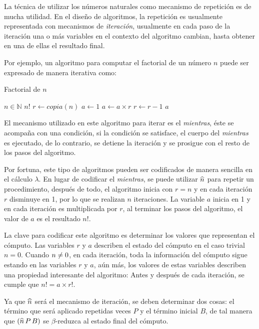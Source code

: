 La técnica de utilizar los números naturales como mecanismo de repetición es de mucha utilidad. En el diseño de algoritmos, la repetición es usualmente representada con mecanismos de \emph{iteración}, usualmente en cada paso de la iteración una o más variables en el contexto del algoritmo cambian, hasta obtener en una de ellas el resultado final.

Por ejemplo, un algoritmo para computar el factorial de un número $ n $ puede ser expresado de manera iterativa como:

\begin{algorithm}
  \caption{Factorial de $ n $}
  \label{alg:factorial}
  \begin{algorithmic}
    \REQUIRE $ n \in \mathbb{N} $
    \ENSURE $ n! $
    \STATE $ r \leftarrow copia(n) $
    \STATE $ a \leftarrow 1 $
    \STATE $ a \leftarrow a \times r $
    \STATE $ r \leftarrow r - 1 $
    \ENDWHILE
    \RETURN $ a $
  \end{algorithmic}
\end{algorithm}

El mecanismo utilizado en este algoritmo para iterar es el \emph{mientras}, éste se acompaña con una condición, si la condición se satisface, el cuerpo del \emph{mientras} es ejecutado, de lo contrario, se detiene la iteración y se prosigue con el resto de los pasos del algoritmo.

Por fortuna, este tipo de algoritmos pueden ser codificados de manera sencilla en el cálculo $ λ $. En lugar de codificar el \emph{mientras}, se puede utilizar $ \widehat{n} $ para repetir un procedimiento, después de todo, el algoritmo inicia con $ r = n $ y en cada iteración $ r $ disminuye en 1, por lo que se realizan $ n $ iteraciones. La variable $ a $ inicia en 1 y en cada iteración es multiplicada por $ r $, al terminar los pasos del algoritmo, el valor de $ a $ es el resultado $ n! $.

La clave para codificar este algoritmo es determinar los valores que representan el cómputo. Las variables $ r $ y $ a $ describen el estado del cómputo en el caso trivial $ n = 0 $. Cuando $ n \centernot= 0 $, en cada iteración, toda la información del cómputo sigue estando en las variables $ r $ y $ a $, aún más, los valores de estas variables describen una propiedad interesante del algoritmo: Antes y después de cada iteración, se cumple que $ n! = a \times r! $.

Ya que $ \widehat{n} $ será el mecanismo de iteración, se deben determinar dos cosas: el término que será aplicado repetidas veces $ P $ y el término inicial $ B $, de tal manera que $ (\widehat{n}\, P\, B) $ se $ β $-reduzca al estado final del cómputo.


